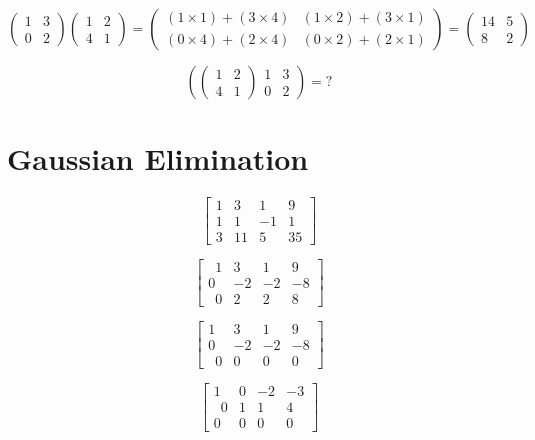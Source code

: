 \bigskip
\large{
\[ \left(
\begin{array}{cc}
1 & 3 \\ 
0 & 2
\end{array} \right)\left(
\begin{array}{cc}
1 & 2 \\ 
4 & 1
\end{array} \right) = \left(
\begin{array}{cc}
(1 \times 1) + (3 \times 4) & (1 \times 2) + (3 \times 1) \\ 
(0 \times 4) + (2 \times 4) & (0 \times 2) + (2 \times 1)
\end{array} \right) = \left(
\begin{array}{cc}
14 & 5 \\ 
8 & 2
\end{array} \right) \]
}

\[ \left(
\left(
\begin{array}{cc}
1 & 2 \\ 
4 & 1
\end{array} \right)
\begin{array}{cc}
1 & 3 \\ 
0 & 2
\end{array} \right) = ? \]

\newpage
\section*{Gaussian Elimination}
\[
\left[\begin{array}{rrr|r}
1 & 3 & 1 & 9 \\
1 & 1 & -1 & 1 \\
3 & 11 & 5 & 35
\end{array}\right]
\]

\[
\left[\begin{array}{rrr|r}
\phantom{0}1 & 3 & 1 & 9 \\
0 & -2 & -2 & -8 \\
\phantom{0}0 & 2 & 2 & 8
\end{array}\right]
\]

\[
\left[\begin{array}{rrr|r}
1 & 3 & 1 & 9 \\
0 & -2 & -2 & -8 \\
\phantom{0}0 & 0 & 0 & 0
\end{array}\right]
\]

\[
\left[\begin{array}{rrr|r}
1 & 0 & -2 & -3 \\
\phantom{0}0 & 1 & 1 & 4 \\
0 & 0 & 0 & 0
\end{array}\right] 
\]




